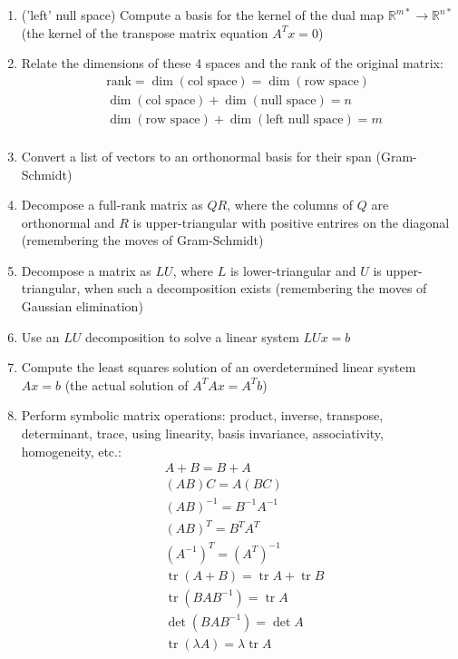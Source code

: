 \documentclass[10pt]{article}
\begin{document}
\begin{enumerate}
\item{('left' null space) Compute a basis for the kernel of the dual map $\mathbb{R}^{m*}\rightarrow\mathbb{R}^{n*}$ (the kernel of the transpose matrix equation $A^{T}x=0$)}
\item{Relate the dimensions of these 4 spaces and the rank of the original matrix:
\begin{align*}
&\text{rank}=\operatorname{dim}(\text{col space})=\operatorname{dim}(\text{row space})\\
&\operatorname{dim}(\text{col space})+\operatorname{dim}(\text{null space})=n\\
&\operatorname{dim}(\text{row space})+\operatorname{dim}(\text{left null space})=m\\
\end{align*}
}
\item{Convert a list of vectors to an orthonormal basis for their span (Gram-Schmidt)}
\item{Decompose a full-rank matrix as $QR$, where the columns of $Q$ are orthonormal and $R$ is upper-triangular with positive entrires on the diagonal (remembering the moves of Gram-Schmidt)}
\item{Decompose a matrix as $LU$, where $L$ is lower-triangular and $U$ is upper-triangular, when such a decomposition exists (remembering the moves of Gaussian elimination)}
\item{Use an $LU$ decomposition to solve a linear system $LUx=b$}
\item{Compute the least squares solution of an overdetermined linear system $Ax=b$ (the actual solution of $A^{T}Ax=A^{T}b$)}
\item{Perform symbolic matrix operations: product, inverse, transpose, determinant, trace, using linearity, basis invariance, associativity, homogeneity, etc.:
\begin{align*}
&A+B=B+A\\
&(AB)C=A(BC)\\
&(AB)^{-1}=B^{-1}A^{-1}\\
&(AB)^{T}=B^{T}A^{T}\\
&(A^{-1})^{T}=(A^{T})^{-1}\\
&\operatorname{tr}(A+B)=\operatorname{tr}A+\operatorname{tr}B\\
&\operatorname{tr}(BAB^{-1})=\operatorname{tr}A\\
&\operatorname{det}(BAB^{-1})=\operatorname{det}A\\
&\operatorname{tr}(\lambda A)=\lambda\operatorname{tr}A\\

\end{align*}}
\end{enumerate}
\end{document}

